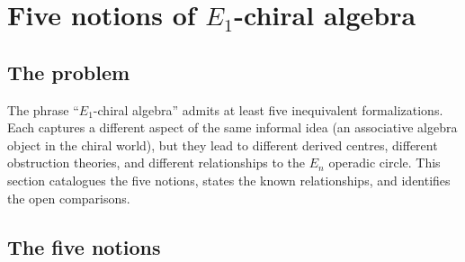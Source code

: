 \documentclass[11pt,reqno]{amsart}
\theoremstyle{definition}
\theoremstyle{remark}
\providecommand{\Eone}{E_1}
\providecommand{\En}{E_n}
\begin{document}

\section{Five notions of $\Eone$-chiral algebra}
\label{sec:five-notions}

\subsection{The problem}

The phrase ``$\Eone$-chiral algebra'' admits at least five
inequivalent formalizations. Each captures a different aspect
of the same informal idea (an associative algebra object in
the chiral world), but they lead to different derived centres,
different obstruction theories, and different relationships
to the $\En$ operadic circle. This section catalogues the five
notions, states the known relationships, and identifies the
open comparisons.

\subsection{The five notions}
\end{document}
